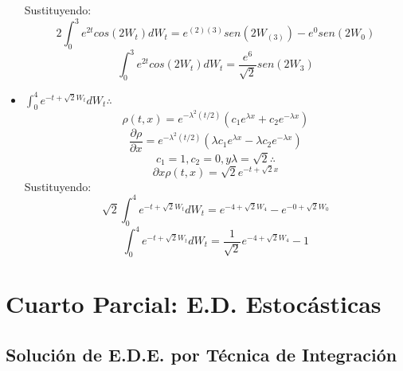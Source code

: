 \documentclass[11pt,fleqn]{book} %
\numberwithin{equation}{section} %
\numberwithin{figure}{section} %
\numberwithin{table}{section} %
\begin{document}
\begin{itemize}
    Sustituyendo:
    $$ 2 \int_{0}^{3} e^{2t} cos(2 W_{t}) dW_{t} = e^{(2)(3)} sen(2 W_{(3)}) - e^{0} sen(2 W_{0})$$
    $$ \int_{0}^{3} e^{2t} cos(2 W_{t}) dW_{t} = \frac{e^{6}}{\sqrt{2}} sen(2 W_{3}) $$
    \item $\int_{0}^{4} e^{-t + \sqrt{2} W_{t}} dW_{t} \therefore$
    $$\rho(t,x) = e^{-\lambda^{2} (t/2)} (c_{1} e^{\lambda x} + c_{2} e^{-\lambda x} ) $$
    $$ \frac{\partial \rho}{\partial x} = e^{-\lambda^{2} (t/2)} ( \lambda c_{1} e^{\lambda x} - \lambda c_{2} e^{-\lambda x} )    $$
    $$c_{1} = 1, c_{2} = 0, y \lambda = \sqrt{2} \therefore$$
    $$ \partial x \rho(t,x) = \sqrt{2} e^{-t + \sqrt{2} x}$$
    Sustituyendo:
    $$ \sqrt{2} \int_{0}^{4} e^{-t + \sqrt{2} W_{t}}  dW_{t} = e^{-4 + \sqrt{2} W_{4}} - e^{-0 + \sqrt{2} W_{0}} $$
    $$ \int_{0}^{4} e^{-t + \sqrt{2} W_{t}}  dW_{t} = \frac{1}{\sqrt{2}} e^{-4 + \sqrt{2} W_{4}} - 1  $$
\end{itemize}
\chapter{Cuarto Parcial: E.D. Estocásticas}
\section{Solución de E.D.E. por Técnica de Integración}
\end{document}
